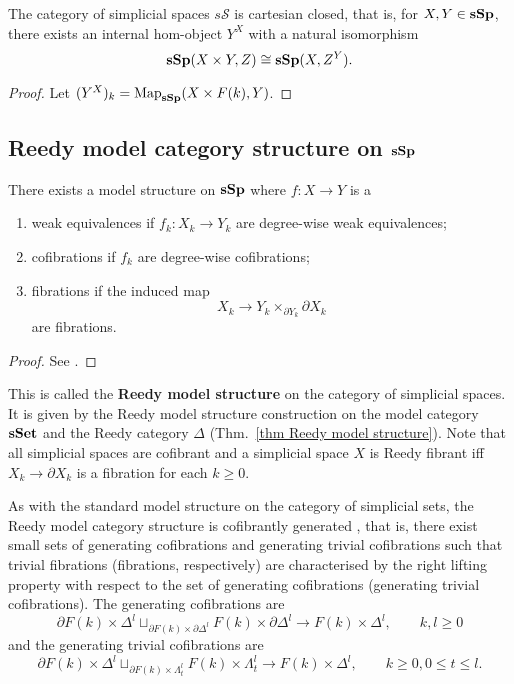 \begin{refsection}
\begin{prop}
The category of simplicial spaces $s\mathcal{S}$ is cartesian closed, that is, for $X,Y\in \mathbf{sSp}$, there exists an internal hom-object $Y^X$ with a natural isomorphism
$$\mathbf{sSp}(X\times Y,Z)\cong \mathbf{sSp}(X,Z^Y).$$
\end{prop}
\begin{proof}
Let $(Y^X)_k=\operatorname{\mathrm{Map}}_{\mathbf{sSp}}(X\times F(k),Y)$.
\end{proof}

\subsection{Reedy model category structure on $\mathbf{sSp}$}
\begin{thm}
There exists a model structure on $\mathbf{sSp}$ where $f:X\to Y$ is a
\begin{enumerate}
\item weak equivalences if $f_k:X_k\to Y_k$ are degree-wise weak equivalences;
\item cofibrations if $f_k$ are degree-wise cofibrations;
\item fibrations if the induced map
\begin{equation} \label{Reedyfib}
X_k\to Y_k\times_{\partial Y_k}\partial X_k
\end{equation}
are fibrations.
\end{enumerate}
\end{thm}
\begin{proof}
See \cite[IV.3.2]{goerss-jardine-simplicial-homotopy-theory}.
\end{proof}

This is called the \textbf{Reedy model structure} on the category of simplicial spaces. It is given by the Reedy model structure construction on the model category $\mathbf{sSet}$ and the Reedy category $\Delta$ (Thm.~\ref{thm Reedy model structure}). Note that all simplicial spaces are cofibrant and a simplicial space $X$ is Reedy fibrant iff $X_k\to\partial X_k$ is a fibration for each $k\ge 0$.

As with the standard model structure on the category of simplicial sets, the Reedy model category structure is cofibrantly generated \cite{dhk}, that is, there exist small sets of generating cofibrations and generating trivial cofibrations such that trivial fibrations (fibrations, respectively) are characterised by the right lifting property with respect to the set of generating cofibrations (generating trivial cofibrations). The generating cofibrations are
$$\partial F(k)\times \Delta^l\sqcup_{\partial F(k)\times\partial\Delta^l}F(k)\times\partial\Delta^l\to F(k)\times\Delta^l,\qquad k,l\ge0$$
and the generating trivial cofibrations are
$$\partial F(k)\times \Delta^l\sqcup_{\partial F(k)\times\Lambda^l_t}F(k)\times\Lambda^l_t\to F(k)\times\Delta^l,\qquad k\ge0,0\le t\le l.$$


\end{refsection}
